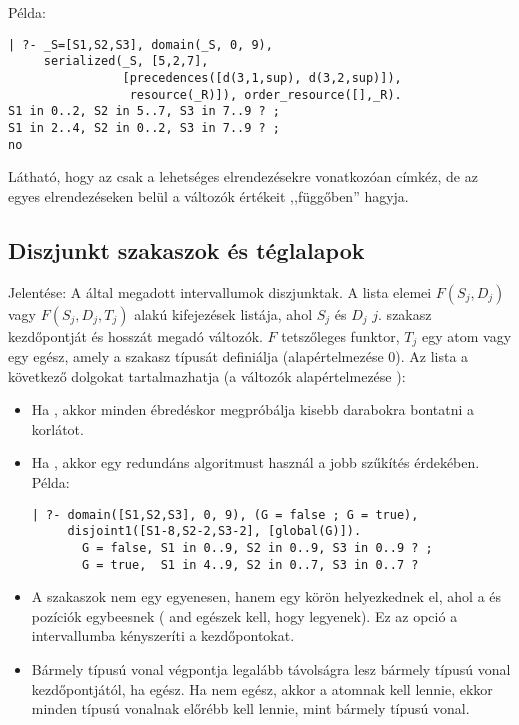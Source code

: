 Példa:

\begin{verbatim}
| ?- _S=[S1,S2,S3], domain(_S, 0, 9),
     serialized(_S, [5,2,7],
                [precedences([d(3,1,sup), d(3,2,sup)]),
                 resource(_R)]), order_resource([],_R).
S1 in 0..2, S2 in 5..7, S3 in 7..9 ? ;
S1 in 2..4, S2 in 0..2, S3 in 7..9 ? ;
no
\end{verbatim}

Látható, hogy az  csak a lehetséges elrendezésekre vonatkozóan
címkéz, de az egyes elrendezéseken belül a változók értékeit ,,függőben'' hagyja.

\subsection{Diszjunkt szakaszok és téglalapok}

{}

Jelentése: A  által megadott intervallumok diszjunktak. A  lista
elemei $F(S_j,D_j)$ vagy $F(S_j,D_j,T_j)$ alakú kifejezések listája, ahol $S_j$ és
$D_j$ $j$. szakasz kezdőpontját és hosszát megadó változók. $F$ tetszőleges funktor,
$T_j$ egy atom vagy egy egész, amely a szakasz típusát definiálja (alapértelmezése 0).
Az  lista a következő dolgokat tartalmazhatja (a  változók
alapértelmezése ):

\begin{itemize}
\item {}
          Ha  , akkor minden ébredéskor megpróbálja kisebb
          darabokra bontatni a korlátot.

\item {}
          Ha  , akkor egy redundáns algoritmust használ a
          jobb szűkítés érdekében. Példa:

\begin{verbatim}
| ?- domain([S1,S2,S3], 0, 9), (G = false ; G = true),
     disjoint1([S1-8,S2-2,S3-2], [global(G)]).
       G = false, S1 in 0..9, S2 in 0..9, S3 in 0..9 ? ;
       G = true,  S1 in 4..9, S2 in 0..7, S3 in 0..7 ?
\end{verbatim}

\item {}
          A szakaszok nem egy egyenesen, hanem egy körön helyezkednek el,
          ahol a  és  pozíciók egybeesnek ( and
           egészek kell, hogy legyenek). Ez az opció a 
          intervallumba kényszeríti a kezdőpontokat.

\item {}
          Bármely  típusú vonal végpontja legalább  távolságra lesz
          bármely  típusú vonal kezdőpontjától, ha  egész.
          Ha  nem egész, akkor a  atomnak kell lennie, ekkor
          minden  típusú vonalnak előrébb kell lennie, mint bármely
           típusú vonal.
\end{itemize}

